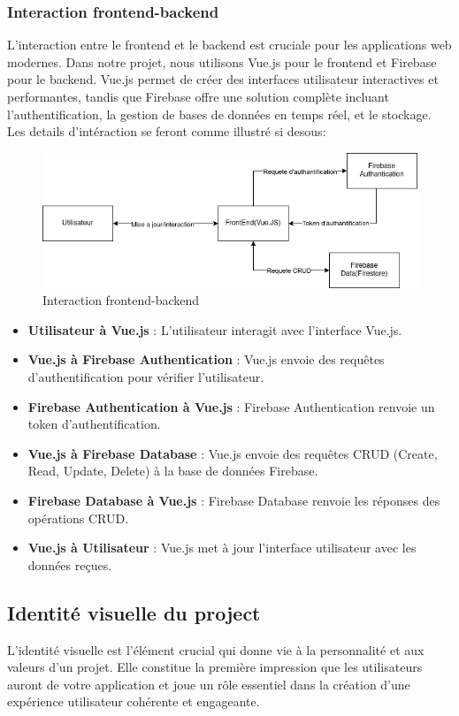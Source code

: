\documentclass[a4paper,12pt]{report}
\begin{document}
\subsubsection{Interaction frontend-backend}
L'interaction entre le frontend et le backend est cruciale pour les applications web modernes. Dans notre projet, nous utilisons Vue.js pour le frontend et Firebase pour le backend. Vue.js permet de créer des interfaces utilisateur interactives et performantes, tandis que Firebase offre une solution complète incluant l'authentification, la gestion de bases de données en temps réel, et le stockage. Les details d'intéraction se feront comme illustré si desous:
\begin{figure}[h!]
    \includegraphics[width=1\textwidth]{./images/backfront-interaction.png}
    \caption{Interaction frontend-backend}
    \label{fig:jira_project_task}
    \end{figure}
\begin{itemize}
  \item \textbf{Utilisateur à Vue.js} : L'utilisateur interagit avec l'interface Vue.js.
  \item \textbf{Vue.js à Firebase Authentication} : Vue.js envoie des requêtes d'authentification pour vérifier l'utilisateur.
  \item \textbf{Firebase Authentication à Vue.js} : Firebase Authentication renvoie un token d'authentification.
  \item \textbf{Vue.js à Firebase Database} : Vue.js envoie des requêtes CRUD (Create, Read, Update, Delete) à la base de données Firebase.
  \item \textbf{Firebase Database à Vue.js} : Firebase Database renvoie les réponses des opérations CRUD.
  \item \textbf{Vue.js à Utilisateur} : Vue.js met à jour l'interface utilisateur avec les données reçues.
\end{itemize}


\subsection{Identité visuelle du project}
L'identité visuelle est l'élément crucial qui donne vie à la personnalité et aux valeurs d'un projet. Elle constitue la première impression que les utilisateurs auront de votre application et joue un rôle essentiel dans la création d'une expérience utilisateur cohérente et engageante.
\end{document}
